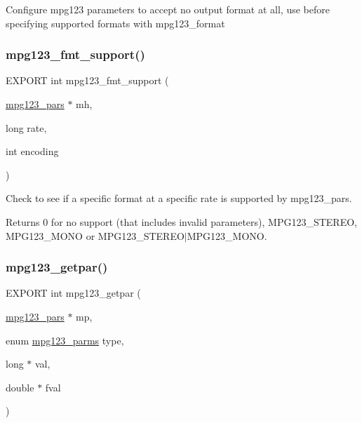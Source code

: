 Configure mpg123 parameters to accept no output format at all, use before specifying supported formats with mpg123\+\_\+format \mbox{\label{group__mpg123__advpar_ga26bfa94065adbda219b0ef4572385293}} 
\subsubsection{\texorpdfstring{mpg123\+\_\+fmt\+\_\+support()}{mpg123\_fmt\_support()}}
{\footnotesize\ttfamily E\+X\+P\+O\+RT int mpg123\+\_\+fmt\+\_\+support (\begin{DoxyParamCaption}\item[{\hyperlink{group__mpg123__advpar_ga3983578625af3bb6dc7e3b74d0cab4aa}{mpg123\+\_\+pars} $\ast$}]{mh,  }\item[{long}]{rate,  }\item[{int}]{encoding }\end{DoxyParamCaption})}

Check to see if a specific format at a specific rate is supported by mpg123\+\_\+pars. \begin{DoxyReturn}{Returns}
0 for no support (that includes invalid parameters), M\+P\+G123\+\_\+\+S\+T\+E\+R\+EO, M\+P\+G123\+\_\+\+M\+O\+NO or M\+P\+G123\+\_\+\+S\+T\+E\+R\+E\+O$\vert$\+M\+P\+G123\+\_\+\+M\+O\+NO. 
\end{DoxyReturn}
\mbox{\label{group__mpg123__advpar_gac8aef7a3971c4617022e288b3fa12285}} 
\subsubsection{\texorpdfstring{mpg123\+\_\+getpar()}{mpg123\_getpar()}}
{\footnotesize\ttfamily E\+X\+P\+O\+RT int mpg123\+\_\+getpar (\begin{DoxyParamCaption}\item[{\hyperlink{group__mpg123__advpar_ga3983578625af3bb6dc7e3b74d0cab4aa}{mpg123\+\_\+pars} $\ast$}]{mp,  }\item[{enum \hyperlink{group__mpg123__init_ga73a8ff3363028b89afc72b3ea032b9cb}{mpg123\+\_\+parms}}]{type,  }\item[{long $\ast$}]{val,  }\item[{double $\ast$}]{fval }\end{DoxyParamCaption})}

